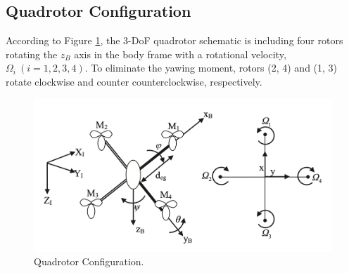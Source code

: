 \documentclass[3p]{elsarticle}
\begin{document}
 \subsection{Quadrotor Configuration}
 \noindent According to Figure \ref{fig:schematic}, the 3-DoF quadrotor schematic is including four rotors rotating the $z_B$ axis in the body frame with a rotational velocity, $\Omega_i~(i=1, 2, 3, 4)$. To eliminate the yawing moment, rotors (2, 4) and (1, 3) rotate clockwise and counter counterclockwise, respectively.

\begin{figure}[H]
    \centering
    \includegraphics[width=12cm]{../Figure/schematic.png}
    \caption{Quadrotor Configuration.}
    \label{fig:schematic}
\end{figure}
\end{document}
